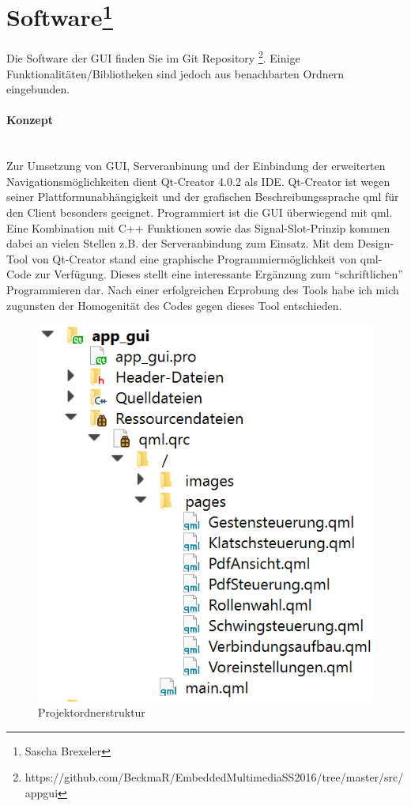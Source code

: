 \section[Software]{Software\footnote{Sascha Brexeler}}
\label{guiSoftware}
Die Software der GUI finden Sie im Git Repository \footnote{https://github.com/BeckmaR/EmbeddedMultimediaSS2016/tree/master/src/app\textunderscore gui}. Einige Funktionalitäten/Bibliotheken sind jedoch aus benachbarten Ordnern eingebunden.

\paragraph{Konzept}$\;$\\
Zur Umsetzung von GUI, Serveranbinung und der Einbindung der erweiterten Navigationsmöglichkeiten dient Qt-Creator 4.0.2 als IDE. Qt-Creator ist wegen seiner Plattformunabhängigkeit und der grafischen Beschreibungssprache qml für den Client besonders geeignet. Programmiert ist die GUI überwiegend mit qml. Eine Kombination mit C++ Funktionen sowie das Signal-Slot-Prinzip kommen dabei an vielen Stellen z.B. der Serveranbindung zum Einsatz. Mit dem Design-Tool von Qt-Creator stand eine graphische Programmiermöglichkeit von qml-Code zur Verfügung. Dieses stellt eine interessante Ergänzung zum "`schriftlichen"' Programmieren dar. Nach einer erfolgreichen Erprobung des Tools habe ich mich zugunsten der Homogenität des Codes gegen dieses Tool entschieden.
\begin{figure}[ht!]
	\centering
	\includegraphics[scale=0.8]{GUI/Bilder/Projektordnerstruktur.PNG}
	\caption{Projektordnerstruktur {\tiny}}
	\label{client:Projektordnerstruktur}
\end{figure}


